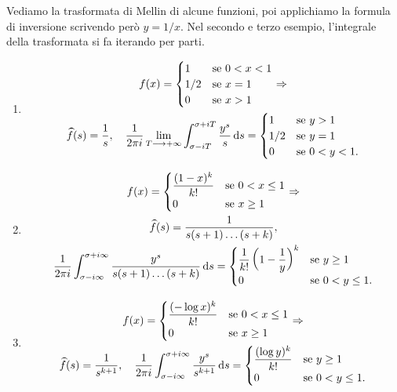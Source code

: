 \begin{ex}
  Vediamo la trasformata di Mellin di alcune funzioni, poi applichiamo la formula di inversione scrivendo però $y=1/x$. Nel secondo e terzo esempio, l'integrale della trasformata si fa iterando per parti.
  \begin{enumerate}
    \item
    \begin{gather*}
      f(x)=\begin{cases}
        1 &\mbox{se } 0<x<1 \\
        1/2 &\mbox{se } x=1 \\
        0 &\mbox{se } x>1
    \end{cases} \implies \\
    \wideparen{f}(s)=\frac{1}{s}, \quad \frac{1}{2\pi i}\lim_{T \longrightarrow +\infty} \int_{\sigma-iT}^{\sigma+iT} \frac{y^s}{s}\diff s=\begin{cases}
      1 &\mbox{se } y>1 \\
      1/2 &\mbox{se } y=1 \\
      0 &\mbox{se } 0<y<1.
    \end{cases}
  \end{gather*}
  \item
  \begin{gather*}
    f(x)=\begin{cases}
      \dfrac{(1-x)^k}{k!} &\mbox{se } 0<x \le 1 \\
      0 &\mbox{se } x \ge 1
      \end{cases} \implies \\
      \wideparen{f}(s)=\frac{1}{s(s+1)\dots(s+k)}, \\ \frac{1}{2\pi i} \int_{\sigma-i\infty}^{\sigma+i\infty} \frac{y^s}{s(s+1)\dots(s+k)}\diff s=\begin{cases}
        \dfrac{1}{k!}\left(1-\dfrac{1}{y}\right)^k &\mbox{se } y \ge 1 \\
        0 &\mbox{se } 0<y \le 1.
      \end{cases}
    \end{gather*}
    \item
    \begin{gather*}
      f(x)=\begin{cases}
        \dfrac{(-\log{x})^k}{k!} &\mbox{se } 0<x \le 1 \\
        0 &\mbox{se } x \ge 1
      \end{cases} \implies \\
      \wideparen{f}(s)=\frac{1}{s^{k+1}}, \quad \frac{1}{2\pi i} \int_{\sigma-i\infty}^{\sigma+i\infty} \frac{y^s}{s^{k+1}}\diff s=\begin{cases}
        \dfrac{(\log{y})^k}{k!} &\mbox{se } y \ge 1 \\
        0 &\mbox{se } 0<y \le 1.
      \end{cases}
    \end{gather*}
  \end{enumerate}
\end{ex}

